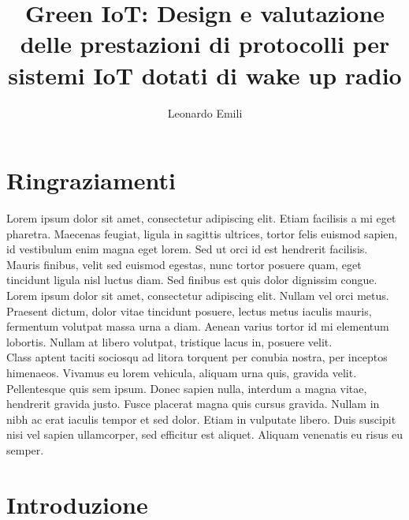 \documentclass[binding=0.6cm,TFA]{sapthesis}
\title{Green IoT: Design e valutazione delle prestazioni di protocolli per sistemi IoT dotati di wake up radio}
\author{Leonardo Emili}
\begin{document}
\large

\frontmatter
\maketitle

\chapter*{Ringraziamenti}

Lorem ipsum dolor sit amet, consectetur adipiscing elit. Etiam facilisis a mi eget pharetra. Maecenas feugiat, ligula in sagittis ultrices, tortor felis
euismod sapien, id vestibulum enim magna eget lorem. Sed ut orci id est hendrerit facilisis. Mauris finibus, velit sed euismod egestas, nunc tortor posuere
quam, eget tincidunt ligula nisl luctus diam. Sed finibus est quis dolor dignissim congue. Lorem ipsum dolor sit amet, consectetur adipiscing elit. Nullam
vel orci metus. Praesent dictum, dolor vitae tincidunt posuere, lectus metus iaculis mauris, fermentum volutpat massa urna a diam. Aenean varius tortor id
mi elementum lobortis. Nullam at libero volutpat, tristique lacus in, posuere velit.\\

Class aptent taciti sociosqu ad litora torquent per conubia nostra, per inceptos himenaeos. Vivamus eu lorem vehicula, aliquam urna quis, gravida velit. Pellentesque
quis sem ipsum. Donec sapien nulla, interdum a magna vitae, hendrerit gravida justo. Fusce placerat magna quis cursus gravida. Nullam in nibh ac erat iaculis tempor
et sed dolor. Etiam in vulputate libero. Duis suscipit nisi vel sapien ullamcorper, sed efficitur est aliquet. Aliquam venenatis eu risus eu semper.

\let\cleardoublepage    %
\clearpage
\let\cleardoublepage\clearpage  %

\tableofcontents

\mainmatter
\chapter{Introduzione}
\end{document}
